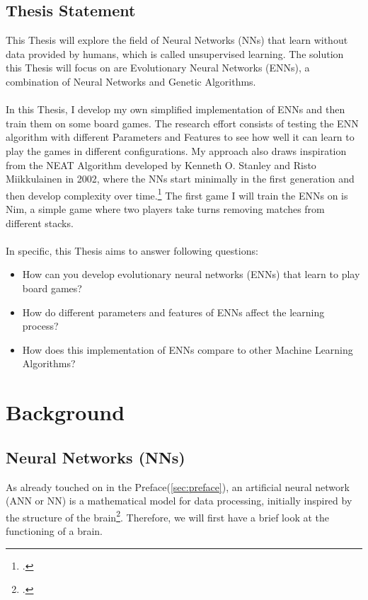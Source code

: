 \documentclass[11pt]{report}
\begin{document}
        \section{Thesis Statement}\label{sec:thesis-statement}
    This Thesis will explore the field of Neural Networks (NNs) that learn without data provided by humans, which is called unsupervised learning.
    The solution this Thesis will focus on are Evolutionary Neural Networks (ENNs), a combination of Neural Networks and Genetic Algorithms.
    \\ \\
    In this Thesis, I develop my own simplified implementation of ENNs and then train them on some board games.
    The research effort consists of testing the ENN algorithm with different Parameters and Features to see how well it can learn to play the games in different configurations.
    My approach also draws inspiration from the NEAT Algorithm developed by Kenneth O. Stanley and Risto Miikkulainen in 2002, where the NNs start minimally in the first generation and then develop complexity over time.\footcite[p.105-106]{Neat_02}
    The first game I will train the ENNs on is Nim, a simple game where two players take turns removing matches from different stacks.
    \\ \\
    In specific, this Thesis aims to answer following questions:
    \begin{itemize}
        \item How can you develop evolutionary neural networks (ENNs) that learn to play board games?
        \item How do different parameters and features of ENNs affect the learning process?
        \item How does this implementation of ENNs compare to other Machine Learning Algorithms?
    \end{itemize}
    \chapter{Background}\label{ch:background}
    \section{Neural Networks (NNs)}\label{sec:neural-networks-(nns)}
    As already touched on in the Preface(\ref{sec:preface}), an artificial neural network (ANN or NN) is a mathematical model for data processing, initially inspired by the structure of the brain\footcite{Chandra_22}.
    Therefore, we will first have a brief look at the functioning of a brain.
\end{document}
